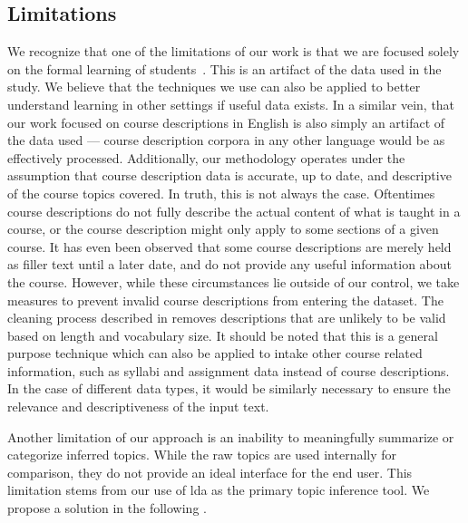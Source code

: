 
\subsection{Limitations}
\label{sec:limitations}


We recognize that one of the limitations of our work is that we are focused solely on the formal learning of students~\cite{Boustedt2011}.
This is an artifact of the data used in the study.
We believe that the techniques we use can also be applied to better understand learning in other settings if useful data exists.
In a similar vein, that our work focused on course descriptions in English is also simply an artifact of the data used --- course description corpora in any other language would be as effectively processed.
Additionally, our methodology operates under the assumption that course description data is accurate, up to date, and descriptive of the course topics covered.
In truth, this is not always the case.
Oftentimes course descriptions do not fully describe the actual content of what is taught in a course, or the course description might only apply to some sections of a given course.
It has even been observed that some course descriptions are merely held as filler text until a later date, and do not provide any useful information about the course.
However, while these circumstances lie outside of our control, we take measures to prevent invalid course descriptions from entering the dataset.
The cleaning process described in  removes descriptions that are unlikely to be valid based on length and vocabulary size.
It should be noted that this is a general purpose technique which can also be applied to intake other course related information, such as syllabi and assignment data instead of course descriptions.
In the case of different data types, it would be similarly necessary to ensure the relevance and descriptiveness of the input text.


Another limitation of our approach is an inability to meaningfully summarize or categorize inferred topics.
While the raw topics are used internally for comparison, they do not provide an ideal interface for the end user.
This limitation stems from our use of \ac{lda} as the primary topic inference tool.
We propose a solution in the following .

